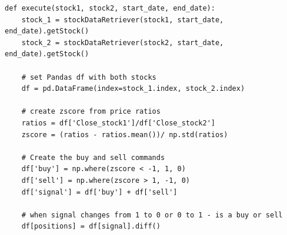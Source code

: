 \documentclass[letterpaper,11pt]{article}
\begin{document}
\begin{verbatim}
def execute(stock1, stock2, start_date, end_date):
    stock_1 = stockDataRetriever(stock1, start_date, end_date).getStock()
    stock_2 = stockDataRetriever(stock2, start_date, end_date).getStock()

    # set Pandas df with both stocks
    df = pd.DataFrame(index=stock_1.index, stock_2.index)

    # create zscore from price ratios
    ratios = df['Close_stock1']/df['Close_stock2']
    zscore = (ratios - ratios.mean())/ np.std(ratios)

    # Create the buy and sell commands
    df['buy'] = np.where(zscore < -1, 1, 0)
    df['sell'] = np.where(zscore > 1, -1, 0)
    df['signal'] = df['buy'] + df['sell']

    # when signal changes from 1 to 0 or 0 to 1 - is a buy or sell
    df[positions] = df[signal].diff()

\end{verbatim}


\nocite{*}

\end{document}
